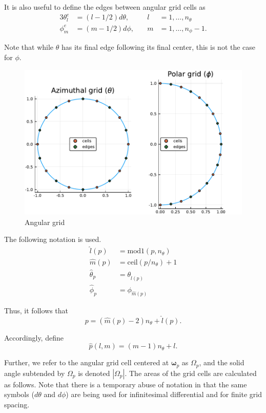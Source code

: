\documentclass[ms,cpyr,lof,lot]{uathesis}
\newcommand{\ceil}{\mbox{ceil}}
\newcommand\abs[1]{\left| #1 \right|}
\renewcommand\vec\bm
\begin{document}
It is also useful to define the edges between angular grid cells as
\begin{alignat}{3}
  \theta_l^e &= (l-1/2) d\theta, &\quad l&=1,\ldots,n_\theta \\
  \phi_m^e &= (m-1/2) d\phi, &\quad m&=1,\ldots,n_\phi-1.
\end{alignat}

Note that while $\theta$ has its final edge following its final center, this is
not the case for $\phi$.

\begin{figure}[h]
  \centering
  \includegraphics[width=.75\linewidth]{angular_grid_plots}
  \caption{Angular grid}
\end{figure}

The following notation is used.
\begin{align*}
  \hat{l}(p) &= \mbox{mod1}(p, n_\theta) \\
  \hat{m}(p) &= \ceil(p/n_\theta) + 1 \\
  \hat{\theta}_p &= \theta_{\hat{l}(p)} \\
  \hat{\phi}_p &= \phi_{\hat{m}(p)}
\end{align*}

Thus, it follows that
\begin{equation*}
  p = \left( \hat{m}(p)-2\right)n_\theta + \hat{l}(p).
\end{equation*}

Accordingly, define
\begin{equation*}
  \hat{p}(l,m) = (m-1)n_\theta + l.
\end{equation*}

Further, we refer to the angular grid cell centered at $\vec{\omega}_p$ as $\Omega_p$, and the solid angle subtended by $\Omega_p$ is denoted $\abs{\Omega_p}$.
The areas of the grid cells are calculated as follows.
Note that there is a temporary abuse of notation in that the same symbols ($d\theta$ and $d\phi$) are being used for infinitesimal differential and for finite grid spacing.
\end{document}

